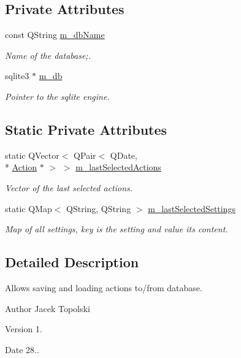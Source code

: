 \subsection*{Private Attributes}
\begin{DoxyCompactItemize}
\item 
const Q\-String \hyperlink{class_database_ae86350d76c5160ec0bcd2b352e82248a}{m\-\_\-db\-Name}
\begin{DoxyCompactList}\small\item\em Name of the database;. \end{DoxyCompactList}\item 
sqlite3 $\ast$ \hyperlink{class_database_ac64f96c196a98d531cbe18a9fadc3b4b}{m\-\_\-db}
\begin{DoxyCompactList}\small\item\em Pointer to the sqlite engine. \end{DoxyCompactList}\end{DoxyCompactItemize}
\subsection*{Static Private Attributes}
\begin{DoxyCompactItemize}
\item 
static Q\-Vector$<$ Q\-Pair$<$ Q\-Date, \\*
\hyperlink{class_action}{Action} $\ast$ $>$ $>$ \hyperlink{class_database_a235387dc22dc1a6057af86c330440dca}{m\-\_\-last\-Selected\-Actions}
\begin{DoxyCompactList}\small\item\em Vector of the last selected actions. \end{DoxyCompactList}\item 
static Q\-Map$<$ Q\-String, Q\-String $>$ \hyperlink{class_database_a5196350281ff8662de16ea7fd06c0e8a}{m\-\_\-last\-Selected\-Settings}
\begin{DoxyCompactList}\small\item\em Map of all settings, key is the setting and value its content. \end{DoxyCompactList}\end{DoxyCompactItemize}


\subsection{Detailed Description}
Allows saving and loading actions to/from database. 

\begin{DoxyAuthor}{Author}
Jacek Topolski 
\end{DoxyAuthor}
\begin{DoxyVersion}{Version}
1. 
\end{DoxyVersion}
\begin{DoxyDate}{Date}
28.. 
\end{DoxyDate}


